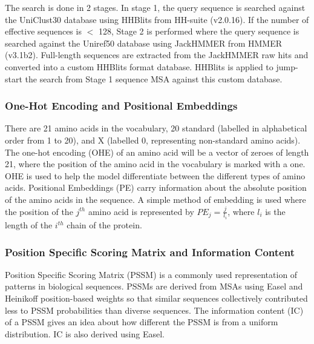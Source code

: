 \documentclass[journal=jcisd8,manuscript=article]{achemso}
\begin{document}
The search is done in 2 stages. In stage 1, the query sequence is searched against the UniClust30 \cite{mirdita2017uniclust} database using HHBlits from HH-suite\cite{remmert2012hhblits} (v2.0.16). If the number of effective sequences is $<$ 128, Stage 2 is performed where the query sequence is searched against the Uniref50 \cite{suzek2015uniref} database using JackHMMER from HMMER \cite{johnson2010hidden} (v3.1b2). Full-length sequences are extracted from the JackHMMER raw hits and converted into a custom HHBlits format database. HHBlits is applied to jump-start the search from Stage 1 sequence MSA against this custom database.

\subsubsection{One-Hot Encoding and Positional Embeddings}
\quad There are 21 amino acids in the vocabulary, 20 standard (labelled in alphabetical order from 1 to 20), and X (labelled 0, representing non-standard amino acids). The one-hot encoding (OHE) of an amino acid will be a vector of zeroes of length 21, where the position of the amino acid in the vocabulary is marked with a one. OHE is used to help the model differentiate between the different types of amino acids. Positional Embeddings (PE) carry information about the absolute position of the amino acids in the sequence. A simple method of embedding is used where the position of the $j^{th}$ amino acid is represented by ${PE}_{j} = \frac{j}{l_i}$, where $l_i$ is the length of the $i^{th}$ chain of the protein.

\newpage
\subsubsection{Position Specific Scoring Matrix and Information Content}
\quad Position Specific Scoring Matrix (PSSM) is a commonly used representation of patterns in biological sequences. PSSMs are derived from MSAs using Easel \cite{potter2018hmmer} and Heinikoff position-based weights so that similar sequences collectively contributed less to PSSM probabilities than diverse sequences. The information content (IC) of a PSSM gives an idea about how different the PSSM is from a uniform distribution. IC is also derived using Easel.
\end{document}
